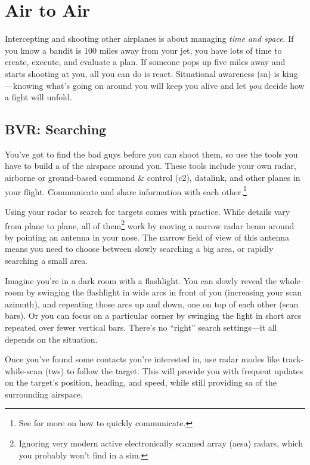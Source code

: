 \chapter{Air to Air}

Intercepting and shooting other airplanes is about managing \emph{time and space}.
If you know a bandit is 100 miles away from your jet,
you have lots of time to create, execute, and evaluate a plan.
If someone pops up five miles away and starts shooting at you,
all you can do is react.
Situational awareness \ac{(sa)} is king---knowing what's going on around
you will keep you alive and let \emph{you} decide how a fight will unfold.

\section{BVR: Searching}

You've got to find the bad guys before you can shoot them,
so use the tools you have to build a  of the airspace
around you.
These tools include your own radar,
airborne or ground-based command \& control \ac{(c2)},
datalink, and other planes in your flight.
Communicate and share information with each other.\punckern\footnote{See
 for more on how to quickly communicate.}

Using your radar to search for targets comes with practice.
While details vary from plane to plane,
all of them\footnote{Ignoring very modern active electronically scanned array
\ac{(aesa)} radars, which you probably won't find in a sim.}
work by moving a narrow radar beam around by pointing an antenna in your nose.
The narrow field of view of this antenna means you need to choose between
slowly searching a big area, or rapidly searching a small area.

Imagine you're in a dark room with a flashlight.
You can slowly reveal the whole room by swinging the flashlight in wide arcs
in front of you (increasing your scan azimuth),
and repeating those arcs up and down, one on top of each other
(scan bars).
Or you can focus on a particular corner by swinging the light in short arcs
repeated over fewer vertical bars.
There's no ``right'' search settings---it
all depends on the situation.

Once you've found some contacts you're interested in,
use radar modes like track-while-scan \ac{(tws)} to follow the target.
This will provide you with frequent updates on the target's position, heading,
and speed, while still providing \ac{sa} of the surrounding airspace.

